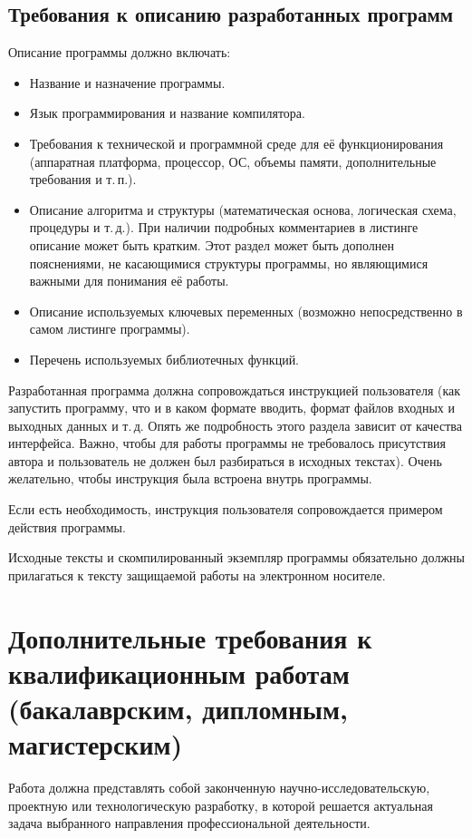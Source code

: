 \documentclass[utf8,12pt, coursreport]{G7-32}
\begin{document}
\section{Требования к описанию разработанных программ}

Описание программы должно включать:
\begin{itemize}
\item Название и назначение программы.
\item Язык программирования и название компилятора.
\item Требования к технической и программной среде для её функционирования (аппаратная платформа, процессор, ОС, объемы памяти, дополнительные требования и т.\,п.).
\item Описание алгоритма и структуры (математическая основа, логическая схема, процедуры и т.\,д.). При наличии подробных комментариев в листинге описание может быть кратким. Этот раздел может быть дополнен пояснениями, не касающимися структуры программы, но являющимися важными для понимания её работы.
\item Описание используемых ключевых переменных (возможно непосредственно в самом листинге программы).
\item Перечень используемых библиотечных функций.
\end{itemize}

Разработанная программа должна сопровождаться инструкцией пользователя (как запустить программу, что и в каком формате вводить, формат файлов входных и выходных данных и т.\,д. Опять же подробность этого раздела зависит от качества интерфейса. Важно, чтобы для работы программы не требовалось присутствия автора и пользователь не должен был разбираться в исходных текстах). Очень желательно, чтобы инструкция была встроена внутрь программы.

Если есть необходимость, инструкция пользователя сопровождается примером действия программы.

Исходные тексты и скомпилированный экземпляр программы обязательно должны прилагаться к тексту защищаемой работы на электронном носителе. 

\chapter{Дополнительные требования к квалификационным работам
(бакалаврским, дипломным, магистерским)}

Работа должна представлять собой законченную научно-исследовательскую, проектную или технологическую разработку, в которой решается актуальная задача выбранного направления профессиональной деятельности.
\end{document}
